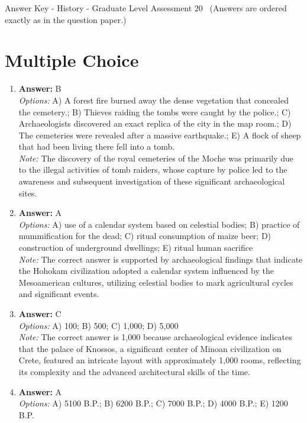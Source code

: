 \documentclass[12pt]{article}
\begin{document}
\begin{center}
Answer Key - History - Graduate Level Assessment 20 \
\small (Answers are ordered exactly as in the question paper.)
\end{center}

\section*{Multiple Choice}
\begin{enumerate}[label=\arabic*.]
\item \textbf{Answer:} B
\\ \textit{Options:} A) A forest fire burned away the dense vegetation that concealed the cemetery.; B) Thieves raiding the tombs were caught by the police.; C) Archaeologists discovered an exact replica of the city in the map room.; D) The cemeteries were revealed after a massive earthquake.; E) A flock of sheep that had been living there fell into a tomb.
\\ \textit{Note:} The discovery of the royal cemeteries of the Moche was primarily due to the illegal activities of tomb raiders, whose capture by police led to the awareness and subsequent investigation of these significant archaeological sites.
\item \textbf{Answer:} A
\\ \textit{Options:} A) use of a calendar system based on celestial bodies; B) practice of mummification for the dead; C) ritual consumption of maize beer; D) construction of underground dwellings; E) ritual human sacrifice
\\ \textit{Note:} The correct answer is supported by archaeological findings that indicate the Hohokam civilization adopted a calendar system influenced by the Mesoamerican cultures, utilizing celestial bodies to mark agricultural cycles and significant events.
\item \textbf{Answer:} C
\\ \textit{Options:} A) 100; B) 500; C) 1,000; D) 5,000
\\ \textit{Note:} The correct answer is 1,000 because archaeological evidence indicates that the palace of Knossos, a significant center of Minoan civilization on Crete, featured an intricate layout with approximately 1,000 rooms, reflecting its complexity and the advanced architectural skills of the time.
\item \textbf{Answer:} A
\\ \textit{Options:} A) 5100 B.P.; B) 6200 B.P.; C) 7000 B.P.; D) 4000 B.P.; E) 1200 B.P.

\end{enumerate}
\end{document}
